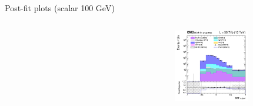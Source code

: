 \documentclass[8pt]{beamer}
\begin{document}
\begin{frame}{Post-fit plots (scalar 100 GeV)}
\begin{columns}
\begin{column}{0.33\textwidth}
\begin{center}
    		\end{center}		
		\end{column}
		\begin{column}{0.33\textwidth}
			\begin{center}
     			\includegraphics[width=1.0\textwidth, height=90pt]{figs/postfits/2018/log_cratio_TTbar_topCR_ll_BDT_ttDM100_TTbar_BDT_output_scalar100_customBinsAttempt7.png}
    		\end{center}		
		\end{column}
\end{columns} \vfill
\end{frame}
\end{document}
